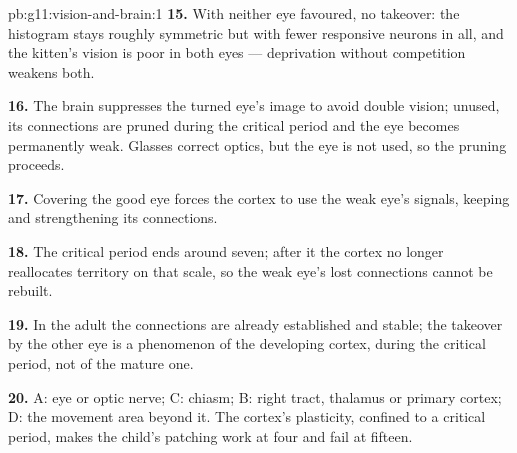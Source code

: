 \begin{solution}{pb:g11:vision-and-brain:1}
\textbf{15.} With neither eye favoured, no takeover: the histogram
stays roughly symmetric but with fewer responsive neurons in all,
and the kitten's vision is poor in both eyes --- deprivation without
competition weakens both.

\textbf{16.} The brain suppresses the turned eye's image to avoid
double vision; unused, its connections are pruned during the critical
period and the eye becomes permanently weak. Glasses correct optics,
but the eye is not used, so the pruning proceeds.

\textbf{17.} Covering the good eye forces the cortex to use the weak
eye's signals, keeping and strengthening its connections.

\textbf{18.} The critical period ends around seven; after it the
cortex no longer reallocates territory on that scale, so the weak
eye's lost connections cannot be rebuilt.

\textbf{19.} In the adult the connections are already established and
stable; the takeover by the other eye is a phenomenon of the
developing cortex, during the critical period, not of the mature one.

\textbf{20.} A: eye or optic nerve; C: chiasm; B: right tract, thalamus
or primary cortex; D: the movement area beyond it. The cortex's
plasticity, confined to a critical period, makes the child's patching
work at four and fail at fifteen.
\end{solution}
